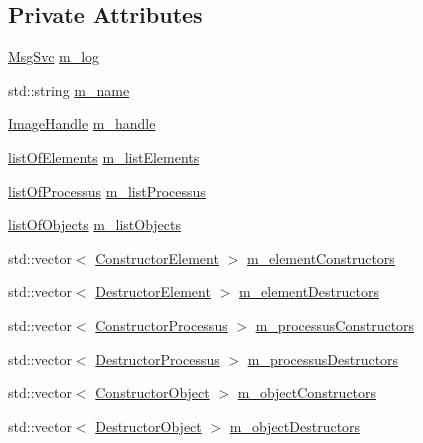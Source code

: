 \subsection*{Private Attributes}
\begin{DoxyCompactItemize}
\item 
\hyperlink{classMsgSvc}{MsgSvc} \hyperlink{classDLL_a6e66cd993e2d142b48691557ce8e4047}{m\_\-log}
\item 
std::string \hyperlink{classDLL_ad5e4d36d8c2575447f73acc2a703b405}{m\_\-name}
\item 
\hyperlink{classDLL_addaefe5c907a5f357cc18718300f22b0}{ImageHandle} \hyperlink{classDLL_a2ca22015aef35c5d61f8daaf3c070154}{m\_\-handle}
\item 
\hyperlink{classDLL_a36792635c3cd36adbaaef2ff7152046e}{listOfElements} \hyperlink{classDLL_a2e88d7167245fd7b6a000817583643ed}{m\_\-listElements}
\item 
\hyperlink{classDLL_aded1b0bb41b288ed4f34cb6d6632d486}{listOfProcessus} \hyperlink{classDLL_a197e92b990184a27a74f4a0456897bd5}{m\_\-listProcessus}
\item 
\hyperlink{classDLL_a68629aa6f9103c5a3082511ff8218b1e}{listOfObjects} \hyperlink{classDLL_af48201f52f29a849489e0104a440bcbb}{m\_\-listObjects}
\item 
std::vector$<$ \hyperlink{classDLL_a7b46644880e5b843144baed79bb2f961}{ConstructorElement} $>$ \hyperlink{classDLL_a7ee65d305f4f6014f6499d69f162d024}{m\_\-elementConstructors}
\item 
std::vector$<$ \hyperlink{classDLL_a6e838cc12677c8ea48d5312984f8f18b}{DestructorElement} $>$ \hyperlink{classDLL_a5004587b4dac5d0ccb0ab99b167ef159}{m\_\-elementDestructors}
\item 
std::vector$<$ \hyperlink{classDLL_ad47776a706e85c9bdae28ec91e88b8e8}{ConstructorProcessus} $>$ \hyperlink{classDLL_af9b49d23b767b742e38a7286de8e7c4d}{m\_\-processusConstructors}
\item 
std::vector$<$ \hyperlink{classDLL_a3bd20fb58c02a1a2f4e96d59da21faf5}{DestructorProcessus} $>$ \hyperlink{classDLL_a5a00cc3723ff34be55c621505f15fc08}{m\_\-processusDestructors}
\item 
std::vector$<$ \hyperlink{classDLL_a19c89e48f530542f639456f569ede17a}{ConstructorObject} $>$ \hyperlink{classDLL_a298d605445e22ef8147ae700848cd737}{m\_\-objectConstructors}
\item 
std::vector$<$ \hyperlink{classDLL_a143a49a77c9a75b043e9dba700afc45b}{DestructorObject} $>$ \hyperlink{classDLL_a8c34d91e0a5ccfc34fff7c66f542b2d7}{m\_\-objectDestructors}
\end{DoxyCompactItemize}


